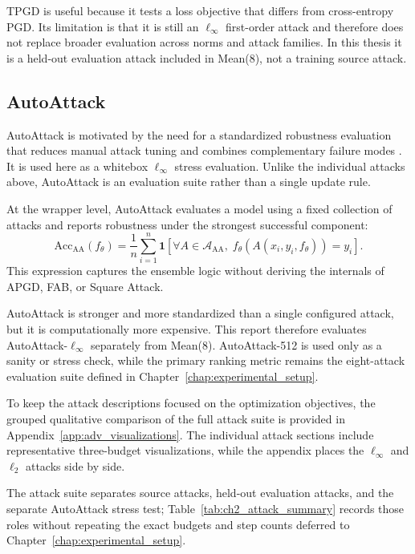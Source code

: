 TPGD is useful because it tests a loss objective that differs from cross-entropy PGD. Its limitation is that it is still an $\ell_\infty$ first-order attack and therefore does not replace broader evaluation across norms and attack families. In this thesis it is a held-out evaluation attack included in Mean(8), not a training source attack.

\subsection{AutoAttack}

AutoAttack is motivated by the need for a standardized robustness evaluation that reduces manual attack tuning and combines complementary failure modes \cite{croce2020reliable}. It is used here as a whitebox $\ell_\infty$ stress evaluation. Unlike the individual attacks above, AutoAttack is an evaluation suite rather than a single update rule.

At the wrapper level, AutoAttack evaluates a model using a fixed collection of attacks and reports robustness under the strongest successful component:
\[
\mathrm{Acc}_{\mathrm{AA}}(f_\theta)
=
\frac{1}{n}\sum_{i=1}^{n}
\mathbf{1}
\left[
\forall A\in\mathcal{A}_{\mathrm{AA}},
\; f_\theta(A(x_i,y_i,f_\theta))=y_i
\right].
\]
This expression captures the ensemble logic without deriving the internals of APGD, FAB, or Square Attack.

AutoAttack is stronger and more standardized than a single configured attack, but it is computationally more expensive. This report therefore evaluates AutoAttack-$\ell_\infty$ separately from Mean(8). AutoAttack-512 is used only as a sanity or stress check, while the primary ranking metric remains the eight-attack evaluation suite defined in Chapter~\ref{chap:experimental_setup}.

To keep the attack descriptions focused on the optimization objectives, the grouped qualitative comparison of the full attack suite is provided in Appendix~\ref{app:adv_visualizations}. The individual attack sections include representative three-budget visualizations, while the appendix places the \(\ell_\infty\) and \(\ell_2\) attacks side by side.

The attack suite separates source attacks, held-out evaluation attacks, and the separate AutoAttack stress test; Table~\ref{tab:ch2_attack_summary} records those roles without repeating the exact budgets and step counts deferred to Chapter~\ref{chap:experimental_setup}.



